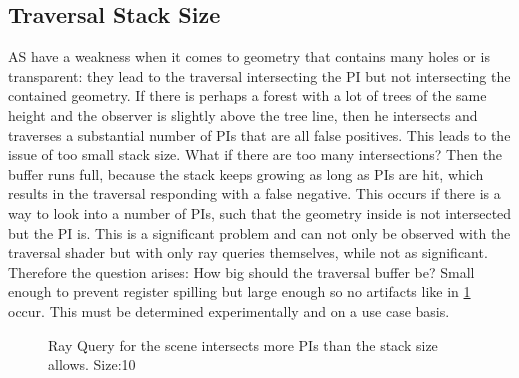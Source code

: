 \subsection{Traversal Stack Size}
\label{sec:BottleStackSize}
AS have a weakness when it comes to geometry that contains many holes or is transparent: they lead to the traversal intersecting the PI but not intersecting the contained geometry. If there is perhaps a forest with a lot of trees of the same height and the observer is slightly above the tree line, then he intersects and traverses a substantial number of PIs that are all false positives. This leads to the issue of too small stack size. What if there are too many intersections? Then the buffer runs full, because the stack keeps growing as long as PIs are hit, which results in the traversal responding with a false negative. This occurs if there is a way to look into a number of PIs, such that the geometry inside is not intersected but the PI is. This is a significant problem and can not only be observed with the traversal shader but with only ray queries themselves, while not as significant. Therefore the question arises: How big should the traversal buffer be? Small enough to prevent register spilling but large enough so no artifacts like in \ref{fig:stackSizeLow} occur. This must be determined experimentally and on a use case basis.
\begin{figure}[h]
\caption{Ray Query for the scene intersects more PIs than the stack size allows. Size:10}
\label{fig:stackSizeLow}
\end{figure}
